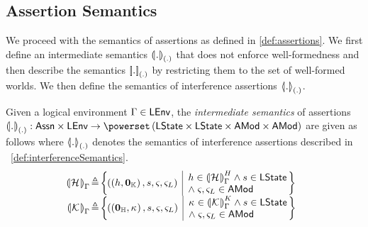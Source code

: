 \subsection{Assertion Semantics}\label{subsec:semantics}
We proceed with the semantics of \colosl assertions as defined in \ref{def:assertions}. We first define an intermediate semantics $\intermediateSem[(.)]{.}$ that does not enforce well-formedness and then describe the semantics $\sem[(.)]{.}$ by restricting them to the set of well-formed worlds. We then define the semantics of interference assertions $\semI[(.)]{.}$. 
%
%
\begin{definition}
Given a logical environment $\lenv \in \LEnv$, the \emph{intermediate semantics} of \colosl assertions $\intermediateSem[(.)]{.}: \Assertions \times \LEnv \rightarrow \pset{\LStates \times \LStates \times \AMods \times \AMods}$ are given as follows where $\semI[(.)]{.}$ denotes the semantics of interference assertions described in  ~\ref{def:interferenceSemantics}.
%
\[
\hspace*{-0.2cm}
\begin{array}{r c l}
	\intermediateSem{\heapAss{}} 
	& \hspace*{-0.3cm} \eqdef \hspace*{-0.3cm} & 
	\left\{
	\hspace*{-0.2cm}
	\begin{array}{l | l}
	 	\left(\left(h, \unitCap \right), s, \amod{}, \amod{L} \right) &
	 	\hspace*{-0.15cm}
		\begin{array}{l}
		 	h \in \semH{\heapAss{}} \land s \in \LStates \\
		  \land\; \amod{}, \amod{L} \in \AMods
		\end{array}
		\hspace*{-0.1cm}
	\end{array}
	\hspace*{-0.2cm}
	\right\}\\
	
	
	\intermediateSem{\capAss{}} 
	& \hspace*{-0.3cm} \eqdef \hspace*{-0.3cm} & 
	\left\{
	\hspace*{-0.2cm}
	\begin{array}{l | l}
	 	\left(\left(\unitH, \ca{} \right), s, \amod{}, \amod{L} \right) &
	 	\hspace*{-0.15cm}
		\begin{array}{l}
		 	\ca{} \in \semK{\capAss{}} \land s \in \LStates \\
		  \land\; \amod{}, \amod{L} \in \AMods
		\end{array}
		\hspace*{-0.1cm}
	\end{array}
	\hspace*{-0.2cm}
	\right\}\\
	

\end{array}\]
\end{definition}
